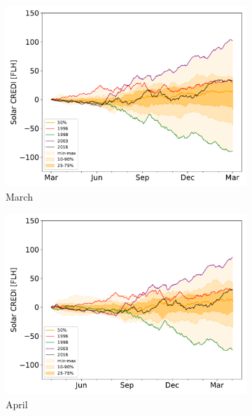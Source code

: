 \documentclass[12pt]{iopart}
\begin{document}
\begin{figure}[t]
\begin{subfigure}[t]{0.32\linewidth}
    \includegraphics[width=\linewidth]{Figures_SI/Fig_CUMSUM_YearStart_SPV_March}
    \caption{March }
\end{subfigure}
\begin{subfigure}[t]{0.32\linewidth}
    \includegraphics[width=\linewidth]{Figures_SI/Fig_CUMSUM_YearStart_SPV_April}
    \caption{April }
\end{subfigure}
\begin{subfigure}[t]{0.32\linewidth}

\end{subfigure}
\end{figure}
\end{document}
